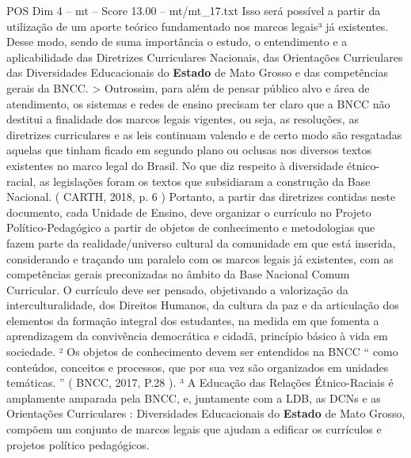 \begin{textsample}{POS Dim 4 – mt – Score 13.00 – mt/mt\_17.txt}
Isso será possível a partir da utilização de um aporte teórico fundamentado nos marcos legais³ já existentes.
Desse modo, sendo de suma importância o estudo, o entendimento e a aplicabilidade das Diretrizes Curriculares Nacionais, das Orientações Curriculares das Diversidades Educacionais do \textbf{Estado} de Mato Grosso e das competências gerais da BNCC. > Outrossim, para além de pensar público alvo e área de atendimento, os sistemas e redes de ensino precisam ter claro que a BNCC não destitui a finalidade dos marcos legais vigentes, ou seja, as resoluções, as diretrizes curriculares e as leis continuam valendo e de certo modo são resgatadas aquelas que tinham ficado em segundo plano ou oclusas nos diversos textos existentes no marco legal do Brasil.
No que diz respeito à diversidade étnico-racial, as legislações foram os textos que subsidiaram a construção da Base Nacional. ( CARTH, 2018, p. 6 ) Portanto, a partir das diretrizes contidas neste documento, cada Unidade de Ensino, deve organizar o currículo no Projeto Político-Pedagógico a partir de objetos de conhecimento e metodologias que fazem parte da realidade/universo cultural da comunidade em que está inserida, considerando e traçando um paralelo com os marcos legais já existentes, com as competências gerais preconizadas no âmbito da Base Nacional Comum Curricular.
O currículo deve ser pensado, objetivando a valorização da interculturalidade, dos Direitos Humanos, da cultura da paz e da articulação dos elementos da formação integral dos estudantes, na medida em que fomenta a aprendizagem da convivência democrática e cidadã, princípio básico à vida em sociedade. ² Os objetos de conhecimento devem ser entendidos na BNCC “ como conteúdos, conceitos e processos, que por sua vez são organizados em unidades temáticas. ” ( BNCC, 2017, P.28 ). ³ A Educação das Relações Étnico-Raciais é amplamente amparada pela BNCC, e, juntamente com a LDB, as DCNs e as Orientações Curriculares : Diversidades Educacionais do \textbf{Estado} de Mato Grosso, compõem um conjunto de marcos legais que ajudam a edificar os currículos e projetos político pedagógicos.

\end{textsample}
